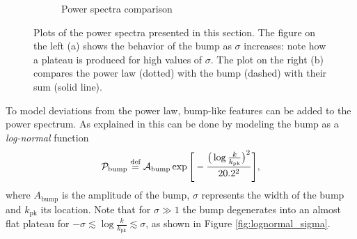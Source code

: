 \begin{figure}
\begin{subfigure}[b]{0.45\textwidth}
\caption{Power spectra comparison}
\label{fig:PS_comp}
\end{subfigure}
\caption{Plots of the power spectra presented in this section. The figure on the left (a) shows the behavior of the bump as $\sigma$ increases: note how a plateau is produced for high values of $\sigma$. The plot on the right (b) compares the power law (dotted) with the bump (dashed) with their sum (solid line). }
\end{figure}

To model deviations from the power law, bump-like features can be added to the power spectrum. As explained in \cite{Hamann_2022} this can be done by modeling the bump as a \emph{log-normal} function
\begin{equation}
    \mathcal P_\text{bump}\stackrel{\text{def}}{=} \mathcal A_\text{bump}\exp\Bigg[-\frac{\big(\log\frac{k}{k_{\text{pk}}}\big)^2}{20.2^2}\Bigg],\label{eq:lognormal}
\end{equation}
where $A_\text{bump}$ is the amplitude of the bump, $\sigma$ represents the width of the bump and $k_\text{pk}$ its location.  Note that for $\sigma\gg 1$ the bump degenerates into an almost flat plateau for $-\sigma\lesssim \log\frac{k}{k_{\text{pk}}}\lesssim\sigma $, as shown in Figure \ref{fig:lognormal_sigma}.



 

